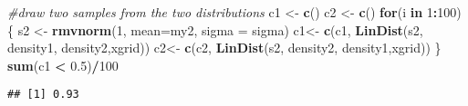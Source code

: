 \documentclass[]{article}
\newenvironment{Shaded}{\begin{snugshade}}{\end{snugshade}}
\newcommand{\CommentTok}[1]{\textcolor[rgb]{0.56,0.35,0.01}{\textit{#1}}}
\newcommand{\ControlFlowTok}[1]{\textcolor[rgb]{0.13,0.29,0.53}{\textbf{#1}}}
\newcommand{\DataTypeTok}[1]{\textcolor[rgb]{0.13,0.29,0.53}{#1}}
\newcommand{\DecValTok}[1]{\textcolor[rgb]{0.00,0.00,0.81}{#1}}
\newcommand{\FloatTok}[1]{\textcolor[rgb]{0.00,0.00,0.81}{#1}}
\newcommand{\KeywordTok}[1]{\textcolor[rgb]{0.13,0.29,0.53}{\textbf{#1}}}
\newcommand{\NormalTok}[1]{#1}
\newcommand{\OperatorTok}[1]{\textcolor[rgb]{0.81,0.36,0.00}{\textbf{#1}}}
\newcommand{\StringTok}[1]{\textcolor[rgb]{0.31,0.60,0.02}{#1}}
\begin{document}
\begin{Shaded}
\begin{Highlighting}[]
\CommentTok{#draw two samples from the two distributions}
\NormalTok{c1 <-}\StringTok{ }\KeywordTok{c}\NormalTok{()}
\NormalTok{c2 <-}\StringTok{ }\KeywordTok{c}\NormalTok{()}
\ControlFlowTok{for}\NormalTok{(i }\ControlFlowTok{in} \DecValTok{1}\OperatorTok{:}\DecValTok{100}\NormalTok{)}
\NormalTok{\{}
\NormalTok{  s2 <-}\StringTok{ }\KeywordTok{rmvnorm}\NormalTok{(}\DecValTok{1}\NormalTok{, }\DataTypeTok{mean=}\NormalTok{my2, }\DataTypeTok{sigma =}\NormalTok{ sigma)}
\NormalTok{  c1<-}\StringTok{ }\KeywordTok{c}\NormalTok{(c1, }\KeywordTok{LinDist}\NormalTok{(s2, density1, density2,xgrid))}
\NormalTok{  c2<-}\StringTok{ }\KeywordTok{c}\NormalTok{(c2, }\KeywordTok{LinDist}\NormalTok{(s2, density2, density1,xgrid))}
\NormalTok{\}}
\KeywordTok{sum}\NormalTok{(c1 }\OperatorTok{<}\StringTok{ }\FloatTok{0.5}\NormalTok{)}\OperatorTok{/}\DecValTok{100}
\end{Highlighting}
\end{Shaded}

\begin{verbatim}
## [1] 0.93
\end{verbatim}
\end{document}
